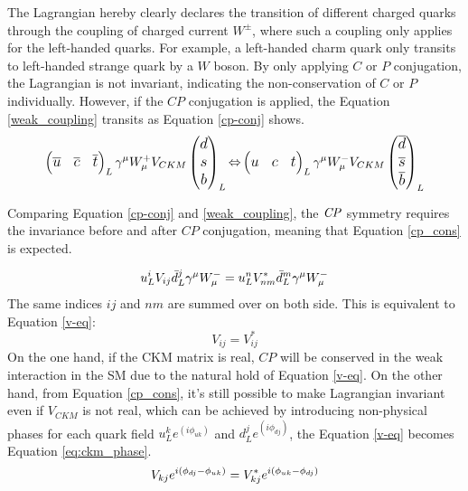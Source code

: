 
The Lagrangian hereby clearly declares the transition of different charged quarks through the coupling of charged current $W^{\pm}$, where such a coupling only applies for the left-handed quarks. For example, a left-handed charm quark only transits to left-handed strange quark by a $W$ boson. By only applying $C$ or $P$ conjugation, the Lagrangian is not invariant, indicating the non-conservation of $C$ or $P$ individually. However, if the $CP$ conjugation is applied, the Equation \ref{weak_coupling} transits as Equation \ref{cp-conj} shows.
\begin{equation}\label{cp-conj}
\small
\large
\begin{pmatrix}
\overline{u}&\overline{c}&\overline{t}
\end{pmatrix}_L
\gamma^\mu W^{+}_{\mu}
V_{CKM}
\begin{pmatrix}
d\\s\\b\\
\end{pmatrix}_L
{\Leftrightarrow}
\begin{pmatrix}
{u}&{c}&{t}
\end{pmatrix}_L
\gamma^\mu W^{-}_{\mu}
{V_{CKM}}
\begin{pmatrix}
\overline d\\\overline s\\\overline b\\
\end{pmatrix}_L
\end{equation} 

Comparing  Equation \ref{cp-conj} and \ref{weak_coupling}, the $\it{CP}$ symmetry requires the invariance before and after $CP$ conjugation, meaning that Equation \ref{cp_cons} is expected.

\begin{equation}\label{cp_cons}
\large
{u_{L}^i}V_{ij} \bar{d}^{j}_L \gamma^\mu W^{-}_{\mu}
=
{{u}^{n}_LV^{*}_{nm}\bar{d}_{L}^m}  \gamma^\mu W^{-}_{\mu}
\end{equation}
The same indices $ij$ and $nm$ are summed over on both side. This is equivalent to Equation \ref{v-eq}: 
\begin{equation}\label{v-eq}
V_{ij} = V^{*}_{ij}
\end{equation}
On the one hand, if the CKM matrix is real, $CP$ will be conserved in the weak interaction in the SM due to the natural hold of Equation \ref{v-eq}. On the other hand, from Equation \ref{cp_cons}, it's still possible to make Lagrangian invariant even if $V_{CKM}$ is not real, which can be achieved by introducing non-physical phases for each quark field $u^k_L e^{(i\phi_{uk})}$ and $d^j_L e^{(i\phi_{dj})}$, the Equation \ref{v-eq} becomes Equation \ref{eq:ckm_phase}.
\begin{equation}\label{eq:ckm_phase}
\Large
V_{kj} e^{i(\phi_{dj}-\phi_{uk})} = V^{*}_{kj}e^{i(\phi_{uk}-\phi_{dj})}
\end{equation}

